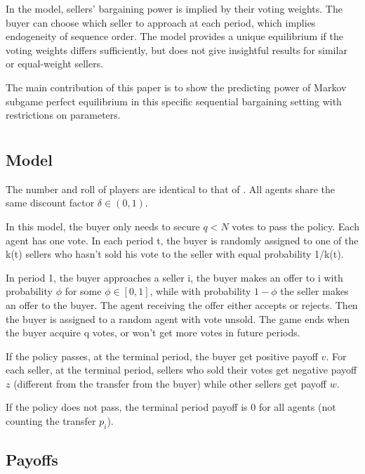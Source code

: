 \documentclass[ProjectGAZ]{subfiles}
\begin{document}
In the \cite{Xiao} model, sellers' bargaining power is implied by their voting weights. The buyer can choose which seller to approach at each period, which implies endogeneity of sequence order. The model provides a unique equilibrium if the voting weights differs sufficiently, but does not give insightful results for similar or equal-weight sellers.

The main contribution of this paper is to show the predicting power of Markov subgame perfect equilibrium in this specific sequential bargaining setting with restrictions on parameters.

\section{\cite{InOCoHoldUP}}

\subsection{Model}\label{subsec:InO-Model}

The number and roll of players are identical to that of \cite{Xiao}. All agents share the same discount factor $\delta \in (0, 1)$.

In this model, the buyer only needs to secure $q < N$ votes to pass the policy. Each agent has one vote. In each period t, the buyer is randomly assigned to one of the k(t) sellers who hasn't sold his vote to the seller with equal probability 1/k(t).  

In period 1, the buyer approaches a seller i, the buyer makes an offer to i with probability $\phi$ for some $\phi \in [0,1]$, while with probability $1 - \phi$ the seller makes an offer to the buyer. The agent receiving the offer either accepts or rejects. Then the buyer is assigned to a random agent with vote unsold. The game ends when the buyer acquire q votes, or won't get more votes in future periods.

If the policy passes, at the terminal period, the buyer get positive payoff $v$. For each seller, at the terminal period, sellers who sold their votes get negative payoff $z$ (different from the transfer from the buyer) while other sellers get payoff $w$.

If the policy does not pass, the terminal period payoff is 0 for all agents (not counting the transfer $p_i$).

\subsection{Payoffs}\label{subsec:InO-Payoffs}
\end{document}
